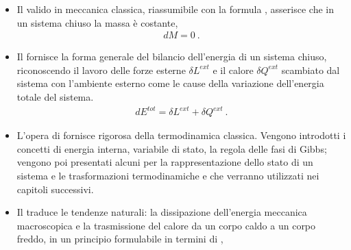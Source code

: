\documentclass[letterpaper,10pt,italian]{jupyterBook}
\begin{document}
\begin{itemize}
\item {} 
\sphinxAtStartPar
Il {\hyperref[\detokenize{ch/thermodynamics/principles-lavoisier:physics-hs-thermodynamics-foundation-principles-lavoisier}]{}} valido in meccanica classica, riassumibile con la formula , asserisce che in un sistema chiuso la massa è costante,
\begin{equation*}
\begin{split}d M = 0 \ .\end{split}
\end{equation*}
\item {} 
\sphinxAtStartPar
Il {\hyperref[\detokenize{ch/thermodynamics/principles-first:physics-hs-thermodynamics-foundation-principles-first}]{}} fornisce la forma generale del bilancio dell’energia  di un sistema chiuso, riconoscendo il lavoro delle forze esterne \(\delta L^{ext}\) e il calore \(\delta Q^{ext}\) scambiato dal sistema con l’ambiente esterno come le cause della variazione dell’energia totale del sistema.
\begin{equation*}
\begin{split}d E^{tot} = \delta L^{ext} + \delta Q^{ext} \ .\end{split}
\end{equation*}
\item {} 
\sphinxAtStartPar
L’opera di  fornisce {\hyperref[\detokenize{ch/thermodynamics/principles-gibbs-phase-rule:physics-hs-thermodynamics-foundation-principles-gibbs-phase-rule}]{}} rigorosa della termodinamica classica. Vengono introdotti i concetti di energia interna, variabile di stato, la regola delle fasi di Gibbs; vengono poi presentati alcuni {\hyperref[\detokenize{ch/thermodynamics/principles-phase-diagrams:physics-hs-thermodynamics-foundation-principles-phase-diagrams}]{}} per la rappresentazione dello stato di un sistema e le trasformazioni termodinamiche e che verranno utilizzati nei capitoli successivi.

\item {} 
\sphinxAtStartPar
Il {\hyperref[\detokenize{ch/thermodynamics/principles-second:physics-hs-thermodynamics-foundation-principles-second}]{}} traduce le tendenze naturali: la dissipazione dell’energia meccanica macroscopica e la trasmissione del calore da un corpo caldo a un corpo freddo, in un principio formulabile in termini di ,

\end{itemize}
\end{document}
